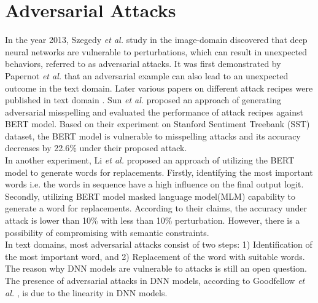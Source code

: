 \documentclass[%
	BCOR=8mm, %
	DIV=12,
	toc=bibliography, %
	toc=listof, %
	oneside, %
	egregdoesnotlikesansseriftitles, %
	]{scrbook}
\begin{document}
\section{Adversarial Attacks}
\label{section:advattacks}
In the year 2013, Szegedy \textit{et al.} \cite{szegedy_intriguing_2014} study in the image-domain discovered that deep neural networks are vulnerable to perturbations, which can result in unexpected behaviors, referred to as adversarial attacks. It was first demonstrated by Papernot \textit{et al.}  \cite{papernot_crafting_2016} that an adversarial example can also lead to an unexpected outcome in the text domain. Later various papers on different attack recipes were published in text domain \cite{alzantot_generating_2018,li_bert-attack_2020,gao_black-box_2018,li_bert-attack_2020,ren_generating_2019,garg_bae_2020,chen_robustness_2019}.  Sun \textit{et al.}  \cite{sun_adv-bert_2020} proposed an approach of  generating adversarial misspelling and evaluated the performance of  attack recipes  against BERT model. Based on their experiment on Stanford Sentiment Treebank (SST) dataset, the BERT model is vulnerable to misspelling attacks and its accuracy decreases by 22.6\% under their proposed attack.\\
In another experiment, Li \textit{et al.} \cite{li_bert-attack_2020} proposed an approach of utilizing the BERT model to generate words for replacements. Firstly, identifying the most important words i.e. the words in sequence have a high influence on the final output logit. Secondly, utilizing BERT model masked language model(MLM) capability to generate a word for replacements. According to their claims, the accuracy under attack is lower than 10\% with less than 10\% perturbation. However, there is a possibility of compromising with semantic constraints.\\
In text domains, most adversarial attacks consist of two steps: 1) Identification of the most important word, and 2) Replacement of the word with suitable words. The reason why DNN models are vulnerable to attacks is still an open question. The presence of adversarial attacks in DNN models, according to Goodfellow \textit{et al.} \cite{goodfellow_explaining_2015}, is due to the linearity in DNN models.
\end{document}
